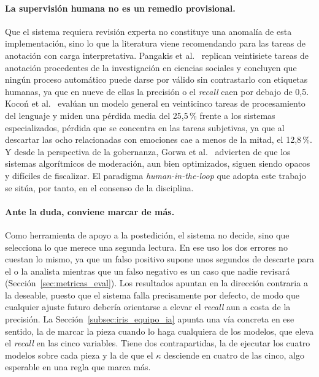 \paragraph{La supervisión humana no es un remedio provisional.} Que el sistema
requiera revisión experta no constituye una anomalía de esta implementación, sino
lo que la literatura viene recomendando para las tareas de anotación con carga
interpretativa. Pangakis et al.~\cite{pangakis2023} replican veintisiete tareas de
anotación procedentes de la investigación en ciencias sociales y concluyen que
ningún proceso automático puede darse por válido sin contrastarlo con etiquetas
humanas, ya que en nueve de ellas la precisión o el \textit{recall} caen por debajo de 0,5.
Kocoń et al.~\cite{kocon2023} evalúan un modelo general en veinticinco tareas de
procesamiento del lenguaje y miden una pérdida media del 25,5\,\% frente a los
sistemas especializados, pérdida que se concentra en las tareas subjetivas, ya que al
descartar las ocho relacionadas con emociones cae a menos de la mitad, el 12,8\,\%. Y desde la perspectiva de la
gobernanza, Gorwa et al.~\cite{gorwa2020} advierten de que los sistemas
algorítmicos de moderación, aun bien optimizados, siguen siendo opacos y difíciles
de fiscalizar. El paradigma \textit{human-in-the-loop} que adopta este trabajo se
sitúa, por tanto, en el consenso de la disciplina.

\paragraph{Ante la duda, conviene marcar de más.} Como herramienta de apoyo a la
postedición, el sistema no decide, sino que selecciona lo que merece una segunda
lectura. En ese uso los dos errores no cuestan lo mismo, ya que un falso positivo
supone unos segundos de descarte para el o la analista mientras que un falso negativo
es un caso que nadie revisará (Sección~\ref{sec:metricas_eval}). Los resultados
apuntan en la dirección contraria a la deseable, puesto que el sistema falla
precisamente por defecto, de modo que cualquier ajuste futuro debería orientarse a
elevar el \textit{recall} aun a costa de la precisión. La Sección~\ref{subsec:iris_equipo_ia}
apunta una vía concreta en ese sentido, la de marcar la pieza cuando lo haga
cualquiera de los modelos, que eleva el \textit{recall} en las cinco variables. Tiene dos
contrapartidas, la de ejecutar los cuatro modelos sobre cada pieza y la de que el
$\kappa$ desciende en cuatro de las cinco, algo esperable en una regla que marca más.

